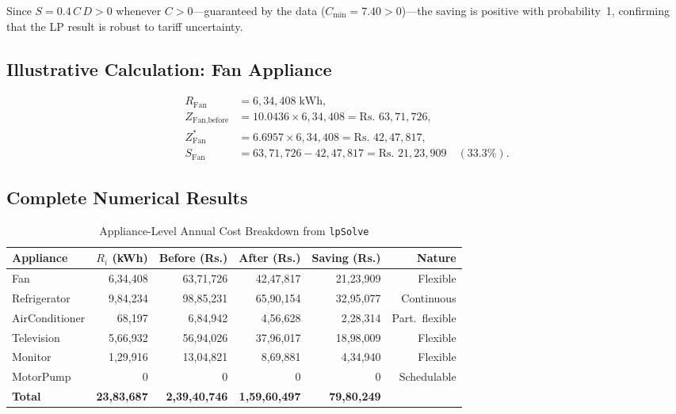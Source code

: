 \documentclass[12pt,a4paper]{article}
\begin{document}
Since $S = 0.4\,C\,D > 0$ whenever $C > 0$---guaranteed by the data
($C_{\min} = 7.40 > 0$)---the saving is positive with probability~1, confirming that
the LP result is robust to tariff uncertainty.

\subsection{Illustrative Calculation: Fan Appliance}

\begin{tcolorbox}[colback=blue!5!white, colframe=isidark,
                  title=Step-by-step for Fan]
\begin{align*}
  R_{\text{Fan}}         &= 6{,}34{,}408\;\text{kWh},\\
  Z_{\text{Fan,before}}  &= 10.0436 \times 6{,}34{,}408 = \text{Rs.~} 63{,}71{,}726,\\
  Z^*_{\text{Fan}}       &= 6.6957  \times 6{,}34{,}408 = \text{Rs.~} 42{,}47{,}817,\\
  S_{\text{Fan}}         &= 63{,}71{,}726 - 42{,}47{,}817
                           = \text{Rs.~} 21{,}23{,}909\quad(33.3\%).
\end{align*}
\end{tcolorbox}

\subsection{Complete Numerical Results}

\begin{table}[H]
\centering
\caption{Appliance-Level Annual Cost Breakdown from \texttt{lpSolve}}
\label{tab:results}
\begin{tabular}{lrrrrr}
\toprule
\textbf{Appliance} & \textbf{$R_i$ (kWh)} & \textbf{Before (Rs.)} &
\textbf{After (Rs.)} & \textbf{Saving (Rs.)} & \textbf{Nature} \\
\midrule
Fan            & 6{,}34{,}408  & 63{,}71{,}726   & 42{,}47{,}817   & 21{,}23{,}909  & Flexible \\
Refrigerator   & 9{,}84{,}234  & 98{,}85{,}231   & 65{,}90{,}154   & 32{,}95{,}077  & Continuous \\
AirConditioner & 68{,}197      & 6{,}84{,}942    & 4{,}56{,}628    & 2{,}28{,}314   & Part.\ flexible \\
Television     & 5{,}66{,}932  & 56{,}94{,}026   & 37{,}96{,}017   & 18{,}98{,}009  & Flexible \\
Monitor        & 1{,}29{,}916  & 13{,}04{,}821   & 8{,}69{,}881    & 4{,}34{,}940   & Flexible \\
MotorPump      & 0             & 0               & 0               & 0              & Schedulable \\
\midrule
\textbf{Total} & \textbf{23{,}83{,}687} & \textbf{2{,}39{,}40{,}746} &
\textbf{1{,}59{,}60{,}497} & \textbf{79{,}80{,}249} & \\
\bottomrule
\end{tabular}
\end{table}
\end{document}
